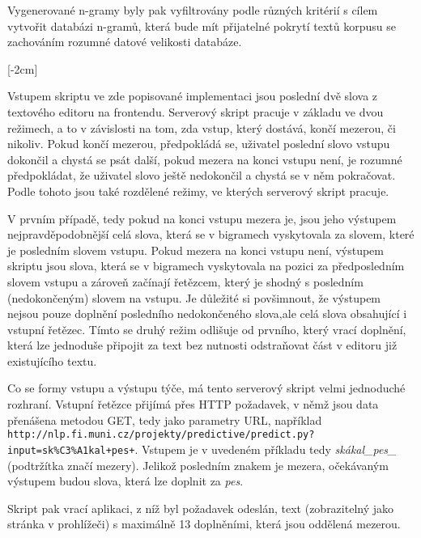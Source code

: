 \documentclass[a4paper,11pt]{article}
\begin{document}

Vygenerované n-gramy byly pak vyfiltrovány podle různých kritérií s cílem vytvořit databázi n-gramů, která bude mít přijatelné pokrytí textů korpusu se zachováním rozumné datové velikosti databáze.


[-2cm]


Vstupem skriptu ve zde popisované implementaci jsou poslední dvě slova z textového editoru na frontendu. Serverový skript pracuje v základu ve dvou režimech, a to v závislosti na tom, zda vstup, který dostává, končí mezerou, či nikoliv. Pokud končí mezerou, předpokládá se, uživatel poslední slovo vstupu dokončil a chystá se psát další, pokud mezera na konci vstupu není, je rozumné předpokládat, že uživatel slovo ještě nedokončil a chystá se v něm pokračovat. Podle tohoto jsou také rozdělené režimy, ve kterých serverový skript pracuje. 

V prvním případě, tedy pokud na konci vstupu mezera je, jsou jeho výstupem nejpravděpodobnější celá slova, která se v bigramech vyskytovala za slovem, které je posledním slovem vstupu. Pokud mezera na konci vstupu není, výstupem skriptu jsou slova, která se v bigramech vyskytovala na pozici za předposledním slovem vstupu a zároveň začínají řetězcem, který je shodný s posledním (nedokončeným) slovem na vstupu. Je důležité si povšimnout, že výstupem nejsou pouze doplnění posledního nedokončeného slova,ale celá slova obsahující i vstupní řetězec. Tímto se druhý režim odlišuje od prvního, který vrací doplnění, která lze jednoduše připojit za text bez nutnosti odstraňovat část v editoru již existujícího textu.

Co se formy vstupu a výstupu týče, má tento serverový skript velmi jednoduché rozhraní. Vstupní řetězce přijímá přes HTTP požadavek, v němž jsou data přenášena metodou GET, tedy jako parametry URL, například {\tt http://nlp.fi.muni.cz/projekty/predictive/predict.py?input=sk\%C3\%A1kal+pes+}. Vstupem je v uvedeném příkladu tedy {\it skákal\_pes\_} (podtržítka značí mezery). Jelikož posledním znakem je mezera, očekávaným výstupem budou slova, která lze doplnit za {\it pes}. 

Skript pak vrací aplikaci, z níž byl požadavek odeslán, text (zobrazitelný jako stránka v prohlížeči) s maximálně 13 doplněními, která jsou oddělená mezerou.
\end{document}
